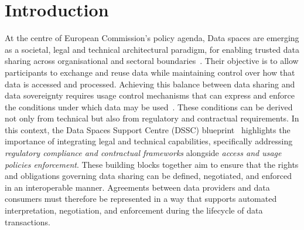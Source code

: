 \section{Introduction}
\label{sec:intro}

At the centre of European Commission's policy agenda,
Data spaces are emerging as a societal, legal and technical architectural paradigm,
for enabling trusted data sharing across organisational
and sectoral boundaries~\cite{farrell_european_2023}.
Their objective is to allow participants
to exchange and reuse data while maintaining control over
how that data is accessed and processed.
Achieving this balance between
data sharing and data sovereignty
requires usage control mechanisms
that can express and enforce the conditions
under which data may be used~\cite{eitel_usage_2021}.
These conditions can be derived not only from technical
but also from regulatory and contractual requirements.
In this context,
the Data Spaces Support Centre (DSSC) blueprint~\cite{data_spaces_support_centre_summary_2026}
highlights the importance of integrating legal and technical capabilities,
specifically addressing \emph{regulatory compliance and contractual frameworks}
alongside \emph{access and usage policies enforcement}.
These building blocks together aim to ensure that
the rights and obligations governing data sharing can be
defined, negotiated, and enforced in an interoperable manner.
Agreements between data providers and data consumers
must therefore be represented in a way that
supports automated interpretation, negotiation,
and enforcement during the lifecycle of data transactions.

